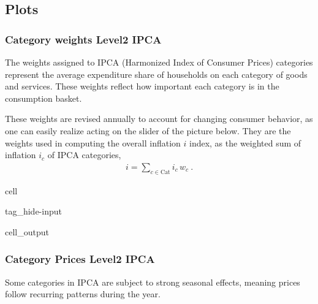 \documentclass[letterpaper,10pt,english]{jupyterBook}
\begin{document}
\subsection{Plots}
\label{\detokenize{code/notebooks/inflation:plots}}

\subsubsection{Category weights \sphinxhyphen{} Level\sphinxhyphen{}2 IPCA}
\label{\detokenize{code/notebooks/inflation:category-weights-level-2-ipca}}
\sphinxAtStartPar
The weights assigned to IPCA (Harmonized Index of Consumer Prices) categories represent the average expenditure share of households on each category of goods and services. These weights reflect how important each category is in the consumption basket.

\sphinxAtStartPar
These weights are revised annually to account for changing consumer behavior, as one can easily realize acting on the slider of the picture below. They are the weights used in computing the overall inflation \(i\) index, as the weighted sum of inflation \(i_c\) of IPCA categories,
\begin{equation*}
\begin{split}i = \sum_{c \in \text{Cat}} i_c \, w_c \ .\end{split}
\end{equation*}
\begin{sphinxuseclass}{cell}
\begin{sphinxuseclass}{tag_hide-input}\begin{sphinxVerbatimOutput}

\begin{sphinxuseclass}{cell_output}
\end{sphinxuseclass}\end{sphinxVerbatimOutput}

\end{sphinxuseclass}
\end{sphinxuseclass}

\subsubsection{Category Prices \sphinxhyphen{} Level\sphinxhyphen{}2 IPCA}
\label{\detokenize{code/notebooks/inflation:category-prices-level-2-ipca}}
\sphinxAtStartPar
Some categories in IPCA are subject to strong seasonal effects, meaning prices follow recurring patterns during the year.
\end{document}
